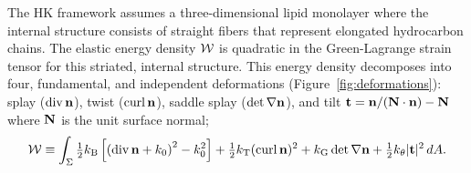 
The HK framework assumes a three-dimensional lipid monolayer where the internal structure
consists of straight fibers that represent elongated hydrocarbon chains.
The elastic energy density ${\cal W}$ is quadratic in the Green-Lagrange strain
tensor for this striated, internal structure.
%
%
%
%
%
This energy density decomposes into four, fundamental, and independent
deformations (Figure~\ref{fig:deformations}): splay ($\operatorname{div} {\bf n}$),
twist ($\operatorname{curl} {\bf n}$), saddle splay ($\det \nabla {\bf n}$), and tilt
${\bf t}={\bf n}/({\bf N}\cdot {\bf n}) - {\bf N}$ where ${\bf N}$ is
the unit surface normal;
\begin{equation}
\label{ansatz3}
{\cal W} \equiv \int_{\Sigma} 
  \tfrac{1}{2}k_{\mathrm{B}}\left[ \left( \operatorname{div} {\bf n} + k_0\right)^2 - k_0^2\right] 
+ \tfrac{1}{2}k_{\mathrm{T}} (\operatorname{curl} {\bf n})^2 + k_{\mathrm{G}}  \det \nabla {\bf n} + \tfrac{1}{2}k_{\theta} |{\bf t}|^2 \,dA.
\end{equation}
